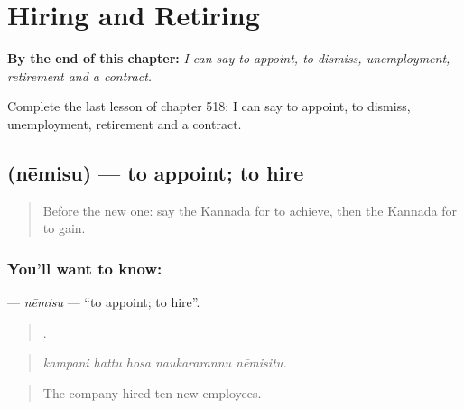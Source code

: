 
\chapter{Hiring and Retiring}
\label{ch:ka-hiring-and-retiring}

\begin{chapteropening}
\textbf{By the end of this chapter:} \emph{I can say to appoint, to dismiss, unemployment, retirement and a contract.}

Complete the last lesson of chapter 518: I can say to appoint, to dismiss, unemployment, retirement and a contract.
\end{chapteropening}

\section[\texorpdfstring{\kn{ನೇಮಿಸು} (nēmisu)}{ನೇಮಿಸು (nēmisu)}]{ (nēmisu) — to appoint; to hire}

\label{lesson:KA-C518-nemisu}



\begin{quote}
Before the new one: say the Kannada for to achieve, then the Kannada for to gain.
\end{quote}

\subsection*{You'll want to know: }
\textbf{} — \emph{nēmisu} — \textquotedblleft{}to appoint; to hire\textquotedblright{}.

\begin{quote}
    .
\end{quote}

\begin{quote}
\emph{kampani hattu hosa naukararannu nēmisitu.}
\end{quote}

\begin{quote}
The company hired ten new employees.
\end{quote}

